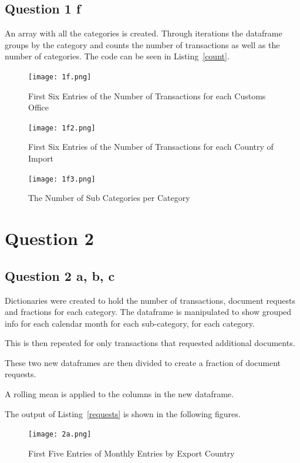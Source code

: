 \documentclass[a4paper,12pt]{article}
\numberwithin{equation}{section}
\numberwithin{figure}{section}
\numberwithin{table}{section}
\begin{document}
\newpage
\subsection{Question 1 f}

An array with all the categories is created. Through iterations the dataframe groups by the category and counts the number of transactions as well as the number of categories. The code can be seen in Listing~\ref{count}. 


\begin{figure}[!htb]
    \centering
    \texttt{[image: 1f.png]}
    \caption{First Six Entries of the Number of Transactions for each Customs Office}
    \label{fig:1f}
\end{figure}
\FloatBarrier

\begin{figure}[!htb]
    \centering
    \texttt{[image: 1f2.png]}
    \caption{First Six Entries of the Number of Transactions for each Country of Import}
    \label{fig:1f2}
\end{figure}
\FloatBarrier
\begin{figure}[!htb]
    \centering
    \texttt{[image: 1f3.png]}
    \caption{The Number of Sub Categories per Category}
    \label{fig:1f3}
\end{figure}
\FloatBarrier

\section{Question 2}
\subsection{Question 2 a, b, c}

Dictionaries were created to hold the number of transactions, document requests and fractions for each category. The dataframe is manipulated to show grouped info for each calendar month for each sub-category, for each category. \par 
This is then repeated for only transactions that requested additional documents. \par
These two new dataframes are then divided to create a fraction of document requests. \par 
A rolling mean is applied to the columns in the new dataframe. \par 
The output of Listing~\ref{requests} is shown in the following figures.

\begin{figure}[!htb]
    \centering
    \texttt{[image: 2a.png]}
    \caption{First Five Entries of Monthly Entries by Export Country}
    \label{fig:2a}
\end{figure}
\FloatBarrier
\end{document}
